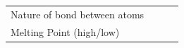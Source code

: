 \begin{enumerate}[noitemsep, label=\textbf{\arabic*}. ]
{{\begin{center}
\begin{xtabular}[t]{|l|l|l|l|}
     \tabularnewline{}
    
    
        Nature of bond between atoms &
    
    
         &
    
    
         &
    
    
     \tabularnewline{}
    
    
        Melting Point (high/low) &
    
    
         &
    
    
         &
    
    

\end{xtabular}
\end{center}}}
\end{enumerate}
